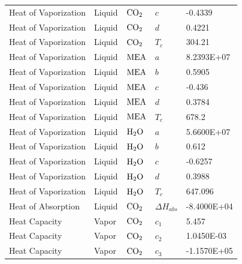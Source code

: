 \documentclass[a4paper,fleqn]{cas-sc}
\begin{document}
\begin{longtable}{lllll}
        Heat of Vaporization      & Liquid         & $\ce{CO2}$          & $c$               & -0.4339        \\
        Heat of Vaporization      & Liquid         & $\ce{CO2}$          & $d$               & 0.4221         \\
        Heat of Vaporization      & Liquid         & $\ce{CO2}$          & $T_c$             & 304.21         \\
        Heat of Vaporization      & Liquid         & $\ce{MEA}$          & $a$               & 8.2393E+07     \\
        Heat of Vaporization      & Liquid         & $\ce{MEA}$          & $b$               & 0.5905         \\
        Heat of Vaporization      & Liquid         & $\ce{MEA}$          & $c$               & -0.436         \\
        Heat of Vaporization      & Liquid         & $\ce{MEA}$          & $d$               & 0.3784         \\
        Heat of Vaporization      & Liquid         & $\ce{MEA}$          & $T_c$             & 678.2          \\
        Heat of Vaporization      & Liquid         & $\ce{H2O}$          & $a$               & 5.6600E+07     \\
        Heat of Vaporization      & Liquid         & $\ce{H2O}$          & $b$               & 0.612          \\
        Heat of Vaporization      & Liquid         & $\ce{H2O}$          & $c$               & -0.6257        \\
        Heat of Vaporization      & Liquid         & $\ce{H2O}$          & $d$               & 0.3988         \\
        Heat of Vaporization      & Liquid         & $\ce{H2O}$          & $T_c$             & 647.096        \\
        Heat of Absorption        & Liquid         & $\ce{CO2}$          & $\Delta H_{abs}$  & -8.4000E+04    \\
        Heat Capacity             & Vapor          & $\ce{CO2}$          & $c_1$             & 5.457          \\
        Heat Capacity             & Vapor          & $\ce{CO2}$          & $c_2$             & 1.0450E-03     \\
        Heat Capacity             & Vapor          & $\ce{CO2}$          & $c_3$             & -1.1570E+05    \\

\end{longtable}
\end{document}
